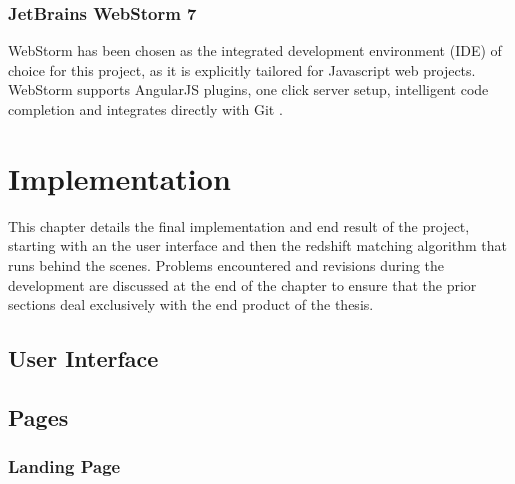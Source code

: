 \documentclass[titlesmallcaps, examinerscopy, copyrightpage]{uqthesis}
\begin{document}
\subsection{JetBrains WebStorm 7}

WebStorm has been chosen as the integrated development environment (IDE) of choice for this project, as it is explicitly tailored for Javascript web projects. WebStorm supports AngularJS plugins, one click server setup, intelligent code completion and integrates directly with Git \cite{WebStorm}.








































\chapter{Implementation}
\label{ch:impl}

This chapter details the final implementation and end result of the project, starting with an the user interface and then the redshift matching algorithm that runs behind the scenes. Problems encountered and revisions during the development are discussed at the end of the chapter to ensure that the prior sections deal exclusively with the end product of the thesis.



\section{User Interface}

\section{Pages}

\subsection{Landing Page}
\end{document}
